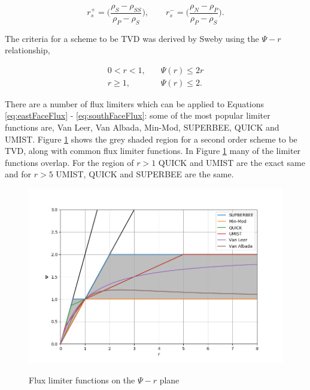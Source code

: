 \begin{equation}
    r_{s}^{+} = \bigg( \frac{\rho_{S} - \rho_{SS}}{\rho_{P} - \rho_{S}}\bigg), \quad \quad r_{s}^{-} = \bigg(\frac{\rho_{N} - \rho_{P}}{\rho_{P} - \rho_{S}} \bigg).
\end{equation}

The criteria for a scheme to be TVD was derived by Sweby \cite{sweby1984} using the $\Psi - r$ relationship,

\begin{equation}
\begin{split}
    0 < r < 1, &\quad \Psi(r) \leq 2r \\
    r \geq 1, &\quad  \Psi (r) \leq 2.
\end{split}
\end{equation}

\noindent There are a number of flux limiters which can be applied to Equations \ref{eq:eastFaceFlux} - \ref{eq:southFaceFlux}: some of the most popular limiter functions are, Van Leer, Van Albada, Min-Mod, SUPERBEE, QUICK and UMIST. Figure \ref{fig:fluxlimiter} shows the grey shaded region for a second order scheme to be TVD, along with common flux limiter functions. In Figure \ref{fig:fluxlimiter} many of the limiter functions overlap. For the region of $r > 1$ QUICK and UMIST are the exact same and for $r > 5$ UMIST, QUICK and SUPERBEE are the same. 


\begin{figure}[t]
  \centering
  \includegraphics[width=5.5in]{images/CFLlimiterFunctions.png}\\
  \caption{Flux limiter functions on the $\Psi - r$ plane}
  \label{fig:fluxlimiter}
\end{figure} 

